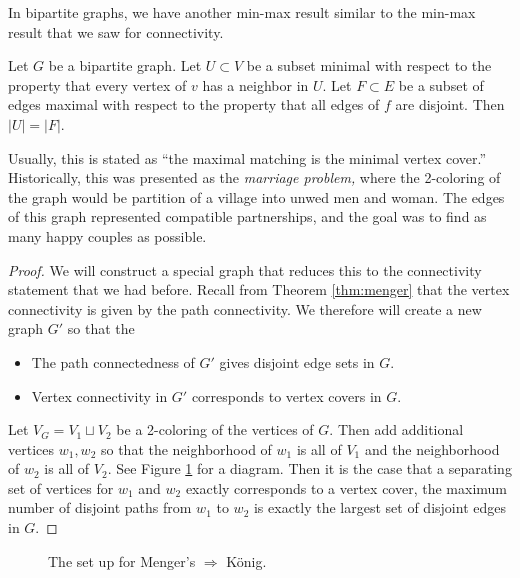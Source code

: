 In bipartite graphs, we have another min-max result similar to the min-max result that we saw for connectivity. 
	\begin{theorem}
 Let $G$ be a bipartite graph. Let $U\subset V$ be a subset minimal with respect to the property that every vertex of $v$ has a neighbor in $U$.  Let $F\subset E$ be a subset of edges maximal with respect to the property that all edges of $f$ are disjoint. Then $|U|=|F|$. 
\end{theorem}
Usually, this is stated as ``the maximal matching is the minimal vertex cover.'' Historically, this was presented as the \emph{marriage problem,} where the 2-coloring of the graph would be partition of a village into unwed men and woman. The edges of this graph represented compatible partnerships, and the goal was to find as many happy couples as possible. 
\begin{proof}
 We will construct a special graph that reduces this to the connectivity statement that we had before. Recall from Theorem \ref{thm:menger} that the vertex connectivity is given by the path connectivity. We therefore will create a new graph $G'$ so that the 
 \begin{itemize}
  \item The path connectedness of $G'$ gives disjoint edge sets in $G$.
  \item Vertex connectivity in $G'$ corresponds to vertex covers in $G$. 
 \end{itemize}
Let $V_G=V_1\sqcup V_2$ be a 2-coloring of the vertices of $G$. Then add additional vertices $w_1, w_2$ so that the neighborhood of $w_1$ is all of $V_1$ and the neighborhood of $w_2$ is all of $V_2$. See Figure \ref{fig:konig} for a diagram. Then it is the case that a separating set of vertices for $w_1$ and $w_2$ exactly corresponds to a vertex cover, the maximum number of disjoint paths from $w_1$ to $w_2$ is exactly the largest set of disjoint edges in $G$. 
\end{proof}
\begin{figure}
  
\centering
{}
\caption{The set up for Menger's $\Rightarrow$ K\"onig.}
\label{fig:konig}
\end{figure}
